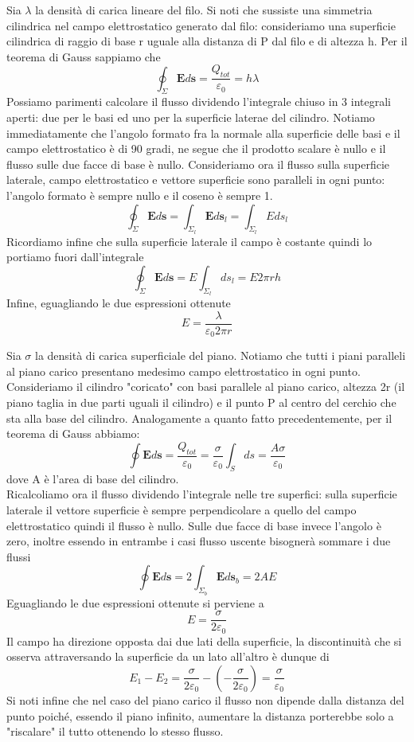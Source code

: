 \documentclass[
10pt, %
a4paper, %
oneside, %
headinclude,footinclude, %
BCOR5mm, %
]{scrartcl}
\begin{document}
\begin{esercizio}
Sia $\lambda$ la densità di carica lineare del filo. Si noti che sussiste una simmetria cilindrica nel campo elettrostatico generato dal filo: consideriamo una superficie cilindrica di raggio di base r uguale alla distanza di P dal filo e di altezza h. Per il teorema di Gauss sappiamo che
\[\oint_{\Sigma}\mathbf{E}d\mathbf{s}=\frac{Q_{tot}}{\varepsilon_0} = h\lambda\]
Possiamo parimenti calcolare il flusso dividendo l'integrale chiuso in 3 integrali aperti: due per le basi ed uno per la superficie laterae del cilindro. Notiamo immediatamente che l'angolo formato fra la normale alla superficie delle basi e il campo elettrostatico è di 90 gradi, ne segue che il prodotto scalare è nullo e il flusso sulle due facce di base è nullo. Consideriamo ora il flusso sulla superficie laterale, campo elettrostatico e vettore superficie sono paralleli in ogni punto: l'angolo formato è sempre nullo e il coseno è sempre 1.
\[\oint_{\Sigma}\mathbf{E}d\mathbf{s}=\int_{\Sigma_l}\mathbf{E}d\mathbf{s}_l= \int_{\Sigma_l}Eds_l\]
Ricordiamo infine che sulla superficie laterale il campo è costante quindi lo portiamo fuori dall'integrale
\[\oint_{\Sigma}\mathbf{E}d\mathbf{s}=E\int_{\Sigma_l}ds_l=E 2\pi r h\]
Infine, eguagliando le due espressioni ottenute
\[E= \frac{\lambda}{\varepsilon_0 2\pi r }\]
\end{esercizio}
\begin{esercizio}\label{es:campo_piano_infinito}
Sia $\sigma$ la densità di carica superficiale del piano. Notiamo che tutti i piani paralleli al piano carico presentano medesimo campo elettrostatico in ogni punto. Consideriamo il cilindro "coricato" con basi parallele al piano carico, altezza 2r (il piano taglia in due parti uguali il cilindro) e il punto P al centro del cerchio che sta alla base del cilindro. Analogamente a quanto fatto precedentemente, per il teorema di Gauss abbiamo:
\[\oint\mathbf{E}d\mathbf{s} = \frac{Q_{tot}}{\varepsilon_0}=\frac{\sigma}{\varepsilon_0}\int_Sds=\frac{A\sigma}{\varepsilon_0}\]
dove A è l'area di base del cilindro.\\
Ricalcoliamo ora il flusso dividendo l'integrale nelle tre superfici: sulla superficie laterale il vettore superficie è sempre perpendicolare a quello del campo elettrostatico quindi il flusso è nullo. Sulle due facce di base invece l'angolo è zero, inoltre essendo in entrambe i casi flusso uscente bisognerà sommare i due flussi
  \[\oint\mathbf{E}d\mathbf{s} = 2\int_{\Sigma_b}\mathbf{E}d\mathbf{s}_b= 2AE\]
Eguagliando le due espressioni ottenute si perviene a 
\[E=\frac{\sigma}{2\varepsilon_0}\]
Il campo ha direzione opposta dai due lati della superficie, la discontinuità che si osserva attraversando la superficie da un lato all'altro è dunque di
\[E_1-E_2 = \frac{\sigma}{2\varepsilon_0}-\left(-\frac{\sigma}{2\varepsilon_0}\right) = \frac{\sigma}{\varepsilon_0}\]
Si noti infine che nel caso del piano carico il flusso non dipende dalla distanza del punto poiché, essendo il piano infinito, aumentare la distanza porterebbe solo a "riscalare" il tutto ottenendo lo stesso flusso.
\end{esercizio}
\end{document}

